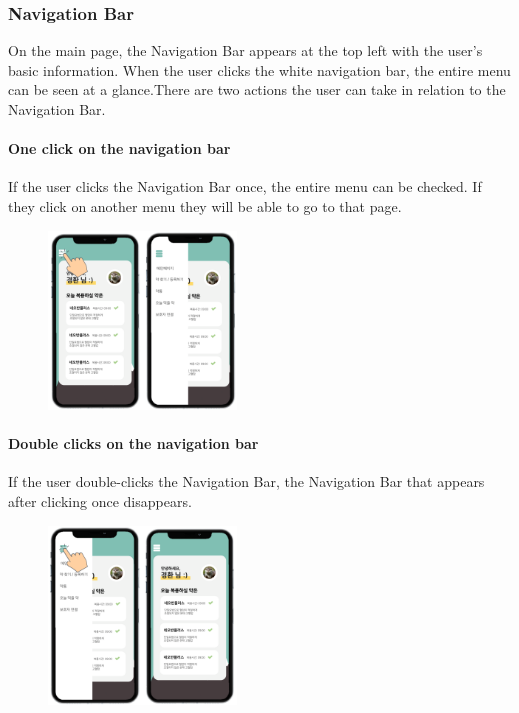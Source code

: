 \documentclass[conference]{IEEEtran}
\begin{document}
\subsubsection{Navigation Bar}
On the main page, the Navigation Bar appears at the top left with the user's basic information. When the user clicks the white navigation bar, the entire menu can be seen at a glance.There are two actions the user can take in relation to the Navigation Bar.\\

\paragraph{One click on the navigation bar}
If the user clicks the Navigation Bar once, the entire menu can be checked. If they click on another menu they will be able to go to that page.\\

\begin{figure}[h!]
\centering
\includegraphics[width=5cm]{final_image_folder/click_navibar.png}
\caption{}
\label{fig:map}
\end{figure}

\paragraph{Double clicks on the navigation bar}
If the user double-clicks the Navigation Bar, the Navigation Bar that appears after clicking once disappears. \\

\begin{figure}[h!]
\centering
\includegraphics[width=5cm]{final_image_folder/click_mypage.png}
\caption{}
\label{fig:map}
\end{figure}
\end{document}
